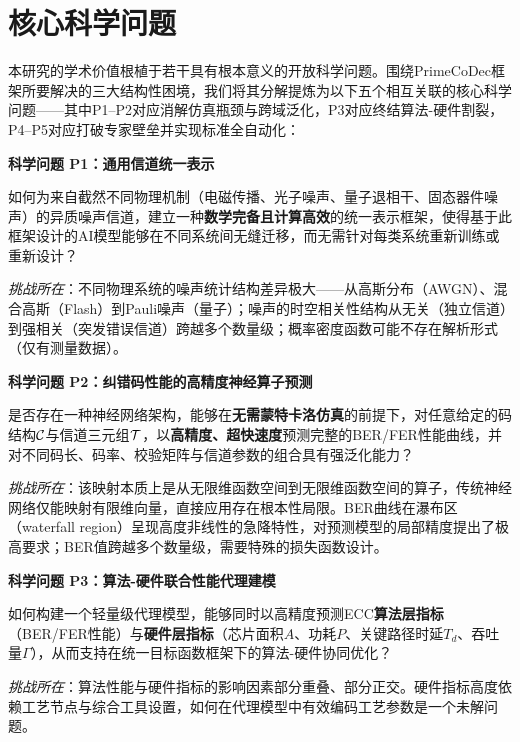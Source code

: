 ﻿\section{核心科学问题}\label{sec:problems}

本研究的学术价值根植于若干具有根本意义的开放科学问题。围绕PrimeCoDec框架所要解决的三大结构性困境，我们将其分解提炼为以下五个相互关联的核心科学问题——其中P1--P2对应消解仿真瓶颈与跨域泛化，P3对应终结算法-硬件割裂，P4--P5对应打破专家壁垒并实现标准全自动化：

\vspace{6pt}
\begin{tcolorbox}[problemstyle]
\textbf{科学问题 P1：通用信道统一表示}

如何为来自截然不同物理机制（电磁传播、光子噪声、量子退相干、固态器件噪声）的异质噪声信道，建立一种\textbf{数学完备且计算高效}的统一表示框架，使得基于此框架设计的AI模型能够在不同系统间无缝迁移，而无需针对每类系统重新训练或重新设计？

\textit{挑战所在}：不同物理系统的噪声统计结构差异极大——从高斯分布（AWGN）、混合高斯（Flash）到Pauli噪声（量子）；噪声的时空相关性结构从无关（独立信道）到强相关（突发错误信道）跨越多个数量级；概率密度函数可能不存在解析形式（仅有测量数据）。
\end{tcolorbox}

\vspace{6pt}
\begin{tcolorbox}[problemstyle]
\textbf{科学问题 P2：纠错码性能的高精度神经算子预测}

是否存在一种神经网络架构，能够在\textbf{无需蒙特卡洛仿真}的前提下，对任意给定的码结构$\mathcal{C}$与信道三元组$\mathcal{T}$，以\textbf{高精度、超快速度}预测完整的BER/FER性能曲线，并对不同码长、码率、校验矩阵与信道参数的组合具有强泛化能力？

\textit{挑战所在}：该映射本质上是从无限维函数空间到无限维函数空间的算子，传统神经网络仅能映射有限维向量，直接应用存在根本性局限。BER曲线在瀑布区（waterfall region）呈现高度非线性的急降特性，对预测模型的局部精度提出了极高要求；BER值跨越多个数量级，需要特殊的损失函数设计。
\end{tcolorbox}

\vspace{6pt}
\begin{tcolorbox}[problemstyle]
\textbf{科学问题 P3：算法-硬件联合性能代理建模}

如何构建一个轻量级代理模型，能够同时以高精度预测ECC\textbf{算法层指标}（BER/FER性能）与\textbf{硬件层指标}（芯片面积$A$、功耗$P$、关键路径时延$T_d$、吞吐量$\Gamma$），从而支持在统一目标函数框架下的算法-硬件协同优化？

\textit{挑战所在}：算法性能与硬件指标的影响因素部分重叠、部分正交。硬件指标高度依赖工艺节点与综合工具设置，如何在代理模型中有效编码工艺参数是一个未解问题。
\end{tcolorbox}

